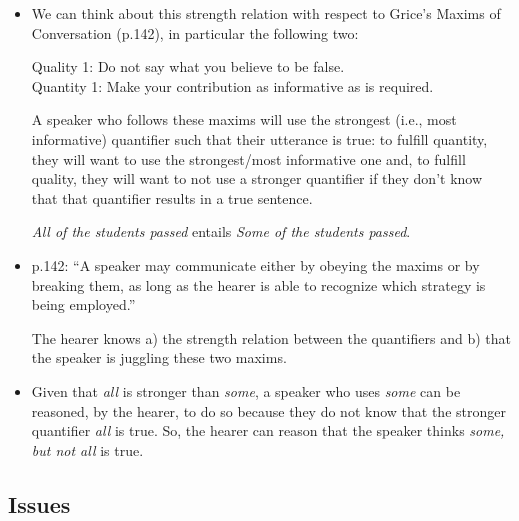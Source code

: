 \documentclass[a4,11pt]{article}
\begin{document}
\begin{itemize}[leftmargin = 12pt]
{\bf Addendum after screencast was made:} This is based on the assumption that, in order for ``All As are Bs'' to be true, the set A is not empty. This is typically captured as a presupposition: researchers assume that ``All As are Bs'' presupposes that the set A is not empty and, if so, that ``All As are Bs'' is true if and only if the set A is included in the set B. As discussed in a previous homework, ``All As are Bs'' does not entail ``Some As are Bs'', if the assumption that the set A is not empty is not made!

\item We can think about this strength relation with respect to Grice's Maxims of Conversation (p.142), in particular the following two:

Quality 1: Do not say what you believe to be false.
\\
Quantity 1: Make your contribution as informative as is required.

A speaker who follows these maxims will use the strongest (i.e., most informative) quantifier such that their utterance is true: to fulfill quantity, they will want to use the strongest/most informative one and, to fulfill quality, they will want to not use a stronger quantifier if they don't know that that quantifier results in a true sentence.

{\em All of the students passed} entails {\em Some of the students passed}.

\item p.142: ``A speaker may communicate either by obeying the maxims or by breaking them, as long as the hearer is able to recognize which strategy is being employed.''

The hearer knows a) the strength relation between the quantifiers and b) that the speaker is juggling these two maxims.

\item Given that {\em all} is stronger than {\em some}, a speaker who uses {\em some} can be reasoned, by the hearer, to do so because they do not know that the stronger quantifier {\em all} is true. So, the hearer can reason that the speaker thinks {\em some, but not all} is true.

\end{itemize}

\subsection*{Issues}
\end{document}

